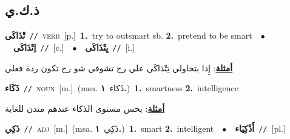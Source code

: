 \documentclass[10pt,a4paper,twoside]{article} %
\begin{document}
\begin{multicols}{2}
\vspace{-3mm}
\subsection*{\color{blue}\foreignlanguage{arabic}{ذ.ك.ي}\color{blue}{}} 

{\setlength\topsep{0pt}\textbf{\foreignlanguage{arabic}{تْذَاكَى}}\ {\color{gray}\texttt{//}\color{black}}\ \textsc{verb}\ [p.]\ \textbf{1.}~try to outsmart sb.  \textbf{2.}~pretend to be smart\ \ $\bullet$\ \ \setlength\topsep{0pt}\textbf{\foreignlanguage{arabic}{اِتْذَاكَى}}\ {\color{gray}\texttt{//}\color{black}}\ [c.]\ \ $\bullet$\ \ \setlength\topsep{0pt}\textbf{\foreignlanguage{arabic}{يِتْذَاكَى}}\ {\color{gray}\texttt{//}\color{black}}\ [i.]\  \begin{flushright}\color{gray}\foreignlanguage{arabic}{\textbf{\underline{\foreignlanguage{arabic}{أمثلة}}}: إِذا بتحاولي تِتْذاكَي علي رح تشوفي شو رح تكون ردة فعلي}\end{flushright}\color{black}} \vspace{2mm}

{\setlength\topsep{0pt}\textbf{\foreignlanguage{arabic}{ذَكَاء}}\ {\color{gray}\texttt{//}\color{black}}\ \textsc{noun}\ [m.]\ \color{gray}(msa. \foreignlanguage{arabic}{ذَكاء}~\foreignlanguage{arabic}{\textbf{١.}})\color{black}\ \textbf{1.}~smartness  \textbf{2.}~intelligence\  \begin{flushright}\color{gray}\foreignlanguage{arabic}{\textbf{\underline{\foreignlanguage{arabic}{أمثلة}}}: بحس مستوى الذكاء عندهم متدن للغاية}\end{flushright}\color{black}} \vspace{2mm}

{\setlength\topsep{0pt}\textbf{\foreignlanguage{arabic}{ذَكِي}}\ {\color{gray}\texttt{//}\color{black}}\ \textsc{adj}\ [m.]\ \color{gray}(msa. \foreignlanguage{arabic}{ذَكِي}~\foreignlanguage{arabic}{\textbf{١.}})\color{black}\ \textbf{1.}~smart  \textbf{2.}~intelligent\ \ $\bullet$\ \ \setlength\topsep{0pt}\textbf{\foreignlanguage{arabic}{أَذْكِيَاء}}\ {\color{gray}\texttt{//}\color{black}}\ [pl.]\ } \vspace{2mm}


\end{multicols}
\end{document}
